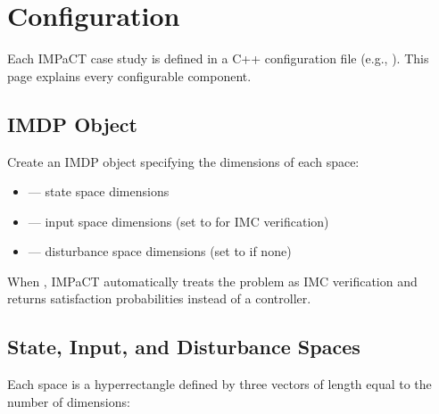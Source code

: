 \documentclass[a4paper,10pt,english]{sphinxmanual}
\begin{document}
\sphinxstepscope


\section{Configuration}
\label{\detokenize{user-guide/configuration:configuration}}\label{\detokenize{user-guide/configuration::doc}}
\sphinxAtStartPar
Each IMPaCT case study is defined in a C++ configuration file (e.g., ).
This page explains every configurable component.


\subsection{IMDP Object}
\label{\detokenize{user-guide/configuration:imdp-object}}
\sphinxAtStartPar
Create an IMDP object specifying the dimensions of each space:

\begin{sphinxVerbatim}[commandchars=\\\{\}]
\end{sphinxVerbatim}
\begin{itemize}
\item {} 
\sphinxAtStartPar
{} — state space dimensions

\item {} 
\sphinxAtStartPar
{} — input space dimensions (set to  for IMC verification)

\item {} 
\sphinxAtStartPar
{} — disturbance space dimensions (set to  if none)

\end{itemize}

\sphinxAtStartPar
When , IMPaCT automatically treats the problem as IMC verification
and returns satisfaction probabilities instead of a controller.


\subsection{State, Input, and Disturbance Spaces}
\label{\detokenize{user-guide/configuration:state-input-and-disturbance-spaces}}
\sphinxAtStartPar
Each space is a hyper\sphinxhyphen{}rectangle defined by three vectors of length equal to the
number of dimensions:
\end{document}
